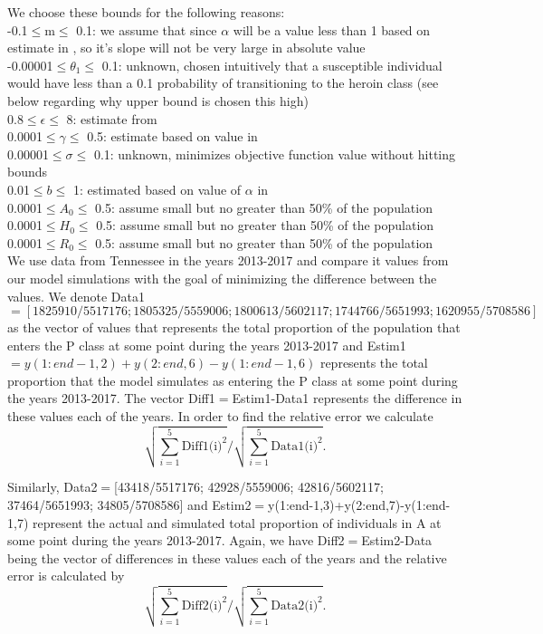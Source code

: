\documentclass[12pt]{article}
\begin{document}
We choose these bounds for the following reasons: \\
-0.1$\leq$m$\leq$ 0.1: we assume that since $\alpha$ will be a value less than 1 based on estimate in \cite{Battista}, so it's slope will not be very large in absolute value \\
-0.00001$\leq$$\theta_1$$\leq$ 0.1: unknown, chosen intuitively that a susceptible individual would have less than a 0.1 probability of transitioning to the heroin class (see below regarding why upper bound is chosen this high) \\
0.8$\leq$$\epsilon$$\leq$ 8: estimate from \cite{Battista} \\
0.0001$\leq$$\gamma$$\leq$ 0.5: estimate based on value in \cite{Battista} \\
0.00001$\leq$$\sigma$$\leq$ 0.1: unknown, minimizes objective function value without hitting bounds \\
0.01$\leq$$b$$\leq$ 1: estimated based on value of $\alpha$ in \cite{Battista} \\
0.0001$\leq$$A_0$$\leq$ 0.5: assume small but no greater than 50\% of the population \\
0.0001$\leq$$H_0$$\leq$ 0.5: assume small but no greater than 50\% of the population \\
0.0001$\leq$$R_0$$\leq$ 0.5: assume small but no greater than 50\% of the population \\

We use data from Tennessee in the years 2013-2017 and compare it values from our model simulations with the goal of minimizing the difference between the values. We denote Data1$=[1825910/5517176; 1805325/5559006; 1800613/5602117; 1744766/5651993; 1620955/5708586]$ as the vector of values that represents the total proportion of the population that enters the P class at some point during the years 2013-2017 and Estim1$=y(1:end-1,2)+y(2:end,6)-y(1:end-1,6)$ represents the total proportion that the model simulates as entering the P class at some point during the years 2013-2017. The vector Diff1$=$Estim1-Data1 represents the difference in these values each of the years. In order to find the relative error we calculate 
$$\displaystyle \sqrt{\sum_{i=1}^{5} \text{Diff1(i)}^2} / \displaystyle \sqrt{\sum_{i=1}^{5} \text{Data1(i)}^2}. $$

Similarly, Data2$=$[43418/5517176; 42928/5559006; 42816/5602117; 37464/5651993; 34805/5708586] and
 Estim2$=$y(1:end-1,3)+y(2:end,7)-y(1:end-1,7) represent the actual and simulated total proportion of individuals in A at some point during the years 2013-2017. Again, we have Diff2$=$Estim2-Data being the vector of differences in these values each of the years and the relative error is calculated by 
 $$\displaystyle \sqrt{\sum_{i=1}^{5} \text{Diff2(i)}^2} / \displaystyle \sqrt{\sum_{i=1}^{5} \text{Data2(i)}^2}.$$
 
\end{document}
